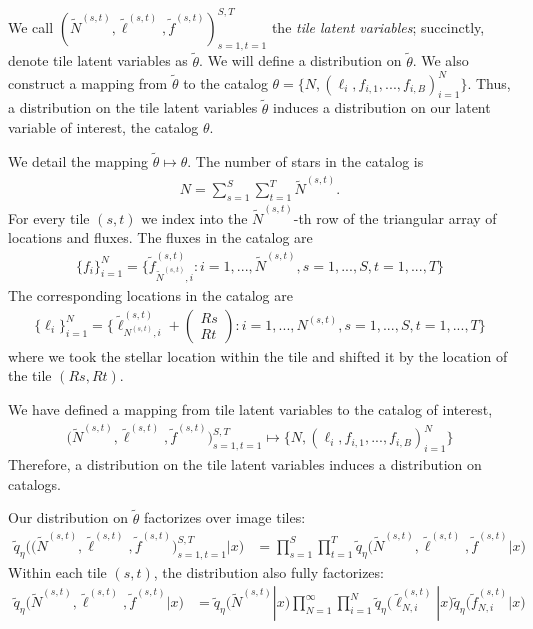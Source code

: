 We call $(\tilde N^{(s, t)}, \tilde \ell^{(s, t)}, \tilde f^{(s, t)})_{s=1,t=1}^{S,T}$ the {\itshape tile latent variables}; 
succinctly, denote tile latent variables as $\tilde\theta$. 
We will define a distribution on $\tilde \theta$. 
We also construct a mapping from $\tilde \theta$ to 
the catalog $\theta = \{N, (\ell_i, f_{i,1}, ..., f_{i,B})_{i = 1}^N\}$. Thus, a distribution 
on the tile latent variables $\tilde \theta$ induces 
a distribution on our latent variable of interest, the catalog $\theta$. 

We detail the mapping $\tilde\theta\mapsto\theta$. 
The number of stars in the catalog is 
\begin{align}
    N = \sum_{s=1}^{S}\sum_{t=1}^T \tilde N^{(s, t)}. 
\end{align}
For every tile $(s,t)$ we index into the $\tilde N^{(s,t)}$-th
row of the triangular array of locations and fluxes. 
The fluxes in the catalog are
\begin{align}
    \{f_i\}_{i=1}^N = \Big\{\tilde f_{\tilde N^{(s, t)}, i}^{(s, t)} : i = 1, ..., \tilde N^{(s, t)}, s = 1, ..., S, t = 1, ..., T \Big\}
\end{align}
The corresponding locations in the catalog are 
\begin{align}
    \{\ell_i\}_{i = 1}^N = \Big\{\tilde \ell_{N^{(s, t)}, i}^{(s, t)} + 
    \begin{pmatrix}
    Rs \\ Rt
    \end{pmatrix} 
    : i = 1, ..., N^{(s, t)}, s = 1, ..., S, t = 1, ..., T\Big\}
\end{align}
where we took the stellar location within the tile and shifted it by the location of the tile $(Rs, Rt)$. 

We have defined a mapping from tile latent variables to the catalog of interest, 
\begin{align}
 \big(\tilde N^{(s, t)}, \tilde \ell^{(s, t)}, \tilde f^{(s, t)}\big)_{s=1, t = 1}^{S, T}
\mapsto     
\{N, (\ell_i, f_{i,1}, ..., f_{i,B})_{i = 1}^N\}
\label{eq:patch_to_full_map}
\end{align}
Therefore, a distribution on the tile latent variables induces a distribution on catalogs. 

Our distribution on $\tilde\theta$ factorizes over image tiles:
\begin{align}
    \tilde q_\eta\big( \big(\tilde N^{(s, t)}, \tilde \ell^{(s, t)}, \tilde f^{(s, t)}\big)_{s=1, t = 1}^{S, T}|x\big) 
    &=
    \prod_{s = 1}^S \prod_{t=1}^T
    \tilde q_\eta\big(\tilde N^{(s, t)}, \tilde \ell^{(s, t)}, \tilde f^{(s, t)} | x\big)
    \label{eq:factorize_patches}
\end{align}
Within each tile $(s,t)$, the distribution also fully factorizes: 
\begin{align}
    \tilde q_\eta\big(\tilde N^{(s, t)}, \tilde \ell^{(s, t)}, \tilde f^{(s, t)} | x\big)
    &= 
    \tilde q_\eta\big(\tilde N^{(s, t)} | x\big)
    \prod_{N = 1}^\infty \prod_{i = 1}^N 
    \tilde q_\eta\big(\tilde \ell_{N,i}^{(s, t)} | x\big)
    \tilde q_\eta\big(\tilde f_{N,i}^{(s, t)} | x\big)
    \label{eq:factorize_within_patch}
\end{align}


